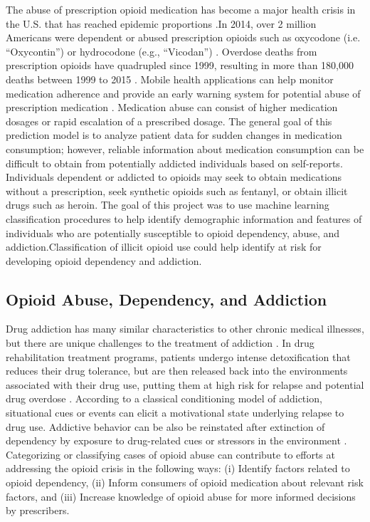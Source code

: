 \documentclass[sigconf]{acmart}
\begin{document}
The abuse of prescription opioid medication has become a major health crisis 
in the U.S. that has reached epidemic proportions \cite{volkow14}.In 2014, 
over 2 million Americans were dependent or abused prescription opioids such 
as oxycodone (i.e. ``Oxycontin'') or hydrocodone (e.g., ``Vicodan'') 
\cite{cdc17}. Overdose deaths from prescription opioids have quadrupled since 
1999, resulting in more than 180,000 deaths between 1999 to 2015 \cite{nida17}. 
Mobile health applications can help monitor medication adherence and provide 
an early warning system for potential abuse of prescription medication 
\cite{varshney13}. Medication abuse can consist of higher medication dosages 
or rapid escalation of a prescribed dosage. The general goal of this prediction 
model is to analyze patient data for sudden changes in medication consumption;
however, reliable information about medication consumption can be difficult 
to obtain from potentially addicted individuals based on self-reports. 
Individuals dependent or addicted to opioids may seek to obtain medications 
without a prescription, seek synthetic opioids such as fentanyl, or obtain 
illicit drugs such as heroin. The goal of this project was to use machine
learning classification procedures to help identify demographic information 
and features of individuals who are potentially susceptible to opioid 
dependency, abuse, and addiction.Classification of illicit opioid use
could help identify at risk for developing opioid dependency and addiction. 

\subsection{Opioid Abuse, Dependency, and Addiction}

Drug addiction has many similar characteristics to other chronic medical 
illnesses, but there are unique challenges to the treatment of addiction
\cite{marsch12, swendson16}. In drug rehabilitation treatment programs, 
patients undergo intense detoxification that reduces their drug tolerance, but 
are then released back into the environments associated with their drug use, 
putting them at high risk for relapse and potential drug overdose 
\cite{johnson11}. According to a classical conditioning model of addiction, 
situational cues or events can elicit a motivational state underlying relapse 
to drug use. Addictive behavior can be also be reinstated after extinction of 
dependency by exposure to drug-related cues or stressors in the environment 
\cite{shaham03}. Categorizing or classifying cases of opioid abuse can 
contribute to efforts at addressing the opioid crisis in the following ways: 
(i) Identify factors related to opioid dependency, (ii) Inform consumers of 
opioid medication about relevant risk factors, and (iii) Increase knowledge 
of opioid abuse for more informed decisions by prescribers. 
\end{document}
